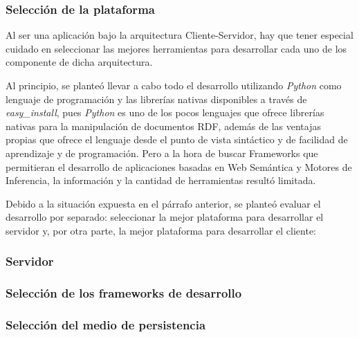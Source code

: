 \subsubsection{Selección de la plataforma}
Al ser una aplicación bajo la arquitectura Cliente-Servidor, hay que tener especial cuidado en seleccionar las mejores herramientas para desarrollar cada uno de los componente de dicha arquitectura.

Al principio, se planteó llevar a cabo todo el desarrollo utilizando \textit{Python} como lenguaje de programación y las librerías nativas disponibles a través de \textit{easy\_install}, pues \textit{Python} es uno de los pocos lenguajes que ofrece librerías nativas para la manipulación de documentos RDF, además de las ventajas propias que ofrece el lenguaje desde el punto de vista sintáctico y de facilidad de aprendizaje y de programación. Pero a la hora de buscar Frameworks que permitieran el desarrollo de aplicaciones basadas en Web Semántica y Motores de Inferencia, la información y la cantidad de herramientas resultó limitada.

Debido a la situación expuesta en el párrafo anterior, se planteó evaluar el desarrollo por separado: seleccionar la mejor plataforma para desarrollar el servidor y, por otra parte, la mejor plataforma para desarrollar el cliente:

\subsubsection{Servidor}


\subsubsection{Selección de los frameworks de desarrollo}


\subsubsection{Selección del medio de persistencia}


\newpage
